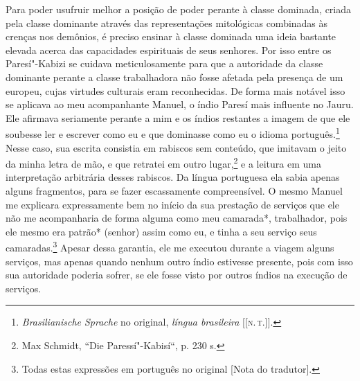 Para poder usufruir melhor a posição de poder perante à classe dominada,
criada pela classe dominante através das representações mitológicas
combinadas às crenças nos demônios, é preciso ensinar à classe dominada
uma ideia bastante elevada acerca das capacidades espirituais de seus
senhores. Por isso entre os Paresí"-Kabizi se cuidava meticulosamente
para que a autoridade da classe dominante perante a classe trabalhadora
não fosse afetada pela presença de um europeu, cujas virtudes culturais
eram reconhecidas. De forma mais notável isso se aplicava ao meu
acompanhante Manuel, o índio Paresí mais influente no Jauru. Ele
afirmava seriamente perante a mim e os índios restantes a imagem de que
ele soubesse ler e escrever como eu e que dominasse como eu o idioma
português.\footnote{\emph{Brasilianische Sprache} no original, \emph{língua
  brasileira} {[}{[}\textsc{n.\,t.}{]}{]}.} Nesse caso, sua escrita consistia em rabiscos sem conteúdo,
que imitavam o jeito da minha letra de mão, e que retratei em outro
lugar,\footnote{Max Schmidt, ``Die Paressí"-Kabisí``, p. 230 s.} e a leitura em uma interpretação arbitrária desses
rabiscos. Da língua portuguesa ela sabia apenas alguns fragmentos, para
se fazer escassamente compreensível. O mesmo Manuel me explicara
expressamente bem no início da sua prestação de serviços que ele não me
acompanharia de forma alguma como meu camarada*, trabalhador, pois ele
mesmo era patrão* (senhor) assim como eu, e tinha a seu serviço seus
camaradas.\footnote{Todas estas expressões em português no original {[}Nota do
  tradutor{]}.} Apesar dessa garantia, ele me executou durante a viagem
alguns serviços, mas apenas quando nenhum outro índio estivesse
presente, pois com isso sua autoridade poderia sofrer, se ele fosse
visto por outros índios na execução de serviços.

